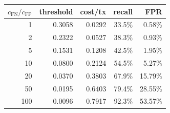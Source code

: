 \begin{tabular}{rrrrr}
\toprule
$c_{\mathrm{FN}}/c_{\mathrm{FP}}$ & threshold & cost/tx & recall & FPR \\
\midrule
1 & 0.3058 & 0.0292 & 33.5\% & 0.58\% \\
2 & 0.2322 & 0.0527 & 38.3\% & 0.93\% \\
5 & 0.1531 & 0.1208 & 42.5\% & 1.95\% \\
10 & 0.0800 & 0.2124 & 54.5\% & 5.27\% \\
20 & 0.0370 & 0.3803 & 67.9\% & 15.79\% \\
50 & 0.0195 & 0.6403 & 79.4\% & 28.55\% \\
100 & 0.0096 & 0.7917 & 92.3\% & 53.57\% \\
\bottomrule
\end{tabular}
